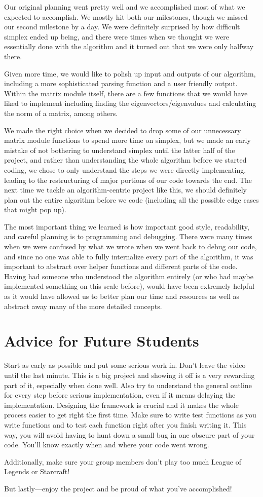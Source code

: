 \documentclass[letterpaper,12pt]{article}
\begin{document}
Our original planning went pretty well and we accomplished most of what we
expected to accomplish. We mostly hit both our milestones, though we missed our
second milestone by a day. We were definitely surprised by how difficult simplex
ended up being, and there were times when we thought we were essentially done
with the algorithm and it turned out that we were only halfway there. 

Given more time, we would like to polish up input and outputs of our algorithm,
including a more sophisticated parsing function and a user friendly output.
Within the matrix module itself, there are a few functions that we would have
liked to implement including finding the eigenvectors/eigenvalues and
calculating the norm of a matrix, among others. 

We made the right choice when we decided to drop some of our unnecessary matrix
module functions to spend more time on simplex, but we made an early mistake of
not bothering to understand simplex until the latter half of the project, and
rather than understanding the whole algorithm before we started coding, we chose
to only understand the steps we were directly implementing, leading to the
restructuring of major portions of our code towards the end. The next time we
tackle an algorithm-centric project like this, we should definitely plan out the
entire algorithm before we code (including all the possible edge cases that
might pop up).

The most important thing we learned is how important good style, readability,
and careful planning is to programming and debugging. There were many times when
we were confused by what we wrote when we went back to debug our code, and since
no one was able to fully internalize every part of the algorithm, it was
important to abstract over helper functions and different parts of the code.
Having had someone who understood the algorithm entirely (or who had maybe
implemented something on this scale before), would have been extremely helpful
as it would have allowed us to better plan our time and resources as well as
abstract away many of the more detailed concepts.

\section{Advice for Future Students}

Start as early as possible and put some serious work in. Don't leave the video
until the last minute. This is a big project and showing it off is a very
rewarding part of it, especially when done well. Also try to understand the
general outline for every step before serious implementation, even if it means
delaying the implementation. Designing the framework is crucial and it makes the
whole process easier to get right the first time. Make sure to write test
functions as you write functions and to test each function right after you
finish writing it. This way, you will avoid having to hunt down a small bug in
one obscure part of your code.  You'll know exactly when and where your code
went wrong. 

Additionally, make sure your group members don't play too much League of Legends
or Starcraft!

But lastly---enjoy the project and be proud of what you've accomplished!
\end{document}

